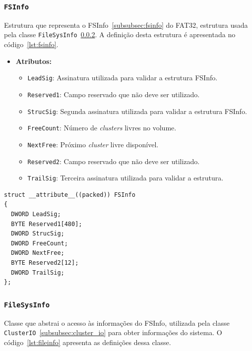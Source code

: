 \documentclass[
    12pt,				%
    oneside,   	        %
    a4paper,			%
    english,			%
    french,				%
    spanish,			%
    brazil,				%
    ]{pacotes/abntex2}
\begin{document}
\subsubsection{\texttt{FSInfo}}
\label{subsubsec:fsinfo_code}

Estrutura que representa o FSInfo~\ref{subsubsec:fsinfo} do FAT32, estrutura usada pela classe \texttt{FileSysInfo}~\ref{subsubsec:file_sys_info}. A definição desta estrutura é apresentada no código~\ref{lst:fsinfo}.

\begin{itemize}
    \item \textbf{Atributos:}
        \begin{itemize}
            \item \texttt{LeadSig}: Assinatura utilizada para validar a estrutura FSInfo.
            \item \texttt{Reserved1}: Campo reservado que não deve ser utilizado.
            \item \texttt{StrucSig}: Segunda assinatura utilizada para validar a estrutura FSInfo.
            \item \texttt{FreeCount}: Número de \textit{clusters} livres no volume.
            \item \texttt{NextFree}: Próximo \textit{cluster} livre disponível.
            \item \texttt{Reserved2}: Campo reservado que não deve ser utilizado.
            \item \texttt{TrailSig}: Terceira assinatura utilizada para validar a estrutura.
        \end{itemize}
\end{itemize}


\begin{lstlisting}[caption={Estrutura que representa o FSInfo encontrado no volume FAT}, label={lst:fsinfo}]
struct __attribute__((packed)) FSInfo
{
  DWORD LeadSig;
  BYTE Reserved1[480]; 
  DWORD StrucSig; 
  DWORD FreeCount; 
  DWORD NextFree; 
  BYTE Reserved2[12]; 
  DWORD TrailSig; 
};
\end{lstlisting}

\subsubsection{\texttt{FileSysInfo}}
\label{subsubsec:file_sys_info}

Classe que abstrai o acesso às informações do FSInfo, utilizada pela classe \texttt{ClusterIO}~\ref{subsubsec:cluster_io} para obter informações do sistema. O código~\ref{lst:fileinfo} apresenta as definições dessa classe. 
\end{document}
